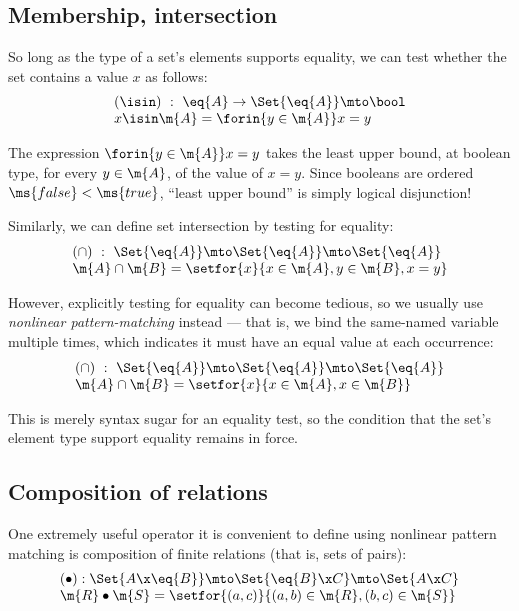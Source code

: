 
\subsection{Membership, intersection}

So long as the type of a set's elements supports equality, we can test whether
the set contains a value $x$ as follows:
\[\begin{array}{l}
(\isin) ~:~ \eq{A} \uto \Set{\eq{A}} \mto \bool\\
x \isin \m{A} = \forin{y \in \m{A}} x = y
\end{array}\]

The expression $\forin{y \in \m{A}} x = y$ takes the least upper bound, at
boolean type, for every $y \in \m{A}$, of the value of $x = y$. Since booleans
are ordered $\ms{false} < \ms{true}$, ``least upper bound'' is simply logical
disjunction! %

Similarly, we can define set intersection by testing for equality:
\[\begin{array}{l}
(\cap) ~:~ \Set{\eq{A}} \mto \Set{\eq{A}} \mto \Set{\eq{A}}\\
\m{A} \cap \m{B} = \setfor{x}{x \in \m{A}, y \in \m{B}, x = y}
\end{array}\]

However, explicitly testing for equality can become tedious, so we usually use
\emph{nonlinear pattern-matching} instead --- that is, we bind the same-named
variable multiple times, which indicates it must have an equal value at each
occurrence:
\[\begin{array}{l}
(\cap) ~:~ \Set{\eq{A}} \mto \Set{\eq{A}} \mto \Set{\eq{A}}\\
\m{A} \cap \m{B} = \setfor{x}{x \in \m{A}, x \in \m{B}}
\end{array}\]

This is merely syntax sugar for an equality test, so the condition that the
set's element type support equality remains in force. 



\subsection{Composition of relations}

One extremely useful operator it is convenient to define using nonlinear pattern
matching is composition of finite relations (that is, sets of pairs):
\[\begin{array}{l}
(\bullet) : \Set{A \x \eq{B}} \mto \Set{\eq{B} \x C} \mto \Set{A \x C}\\
\m{R} \bullet \m{S} = \setfor{(a,c)}{(a,b) \in \m{R}, (b,c) \in \m{S}}
\end{array}\]

